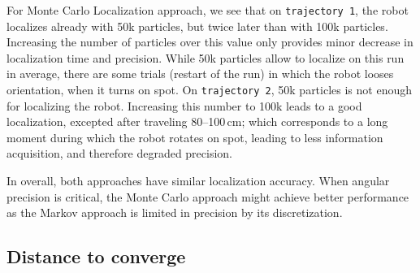 \documentclass[letterpaper, 10pt, conference]{ieeeconf}
\begin{document}
For Monte Carlo Localization approach, we see that on \texttt{trajectory~1}, the robot localizes already with 50k particles, but twice later than with 100k particles.
Increasing the number of particles over this value only provides minor decrease in localization time and precision.
While 50k particles allow to localize on this run in average, there are some trials (restart of the run) in which the robot looses orientation, when it turns on spot.
On \texttt{trajectory~2}, 50k particles is not enough for localizing the robot.
Increasing this number to 100k leads to a good localization, excepted after traveling 80--100\,cm; which corresponds to a long moment during which the robot rotates on spot, leading to less information acquisition, and therefore degraded precision.

In overall, both approaches have similar localization accuracy.
When angular precision is critical, the Monte Carlo approach might achieve better performance as the Markov approach is limited in precision by its discretization.


\subsection{Distance to converge}
\end{document}
